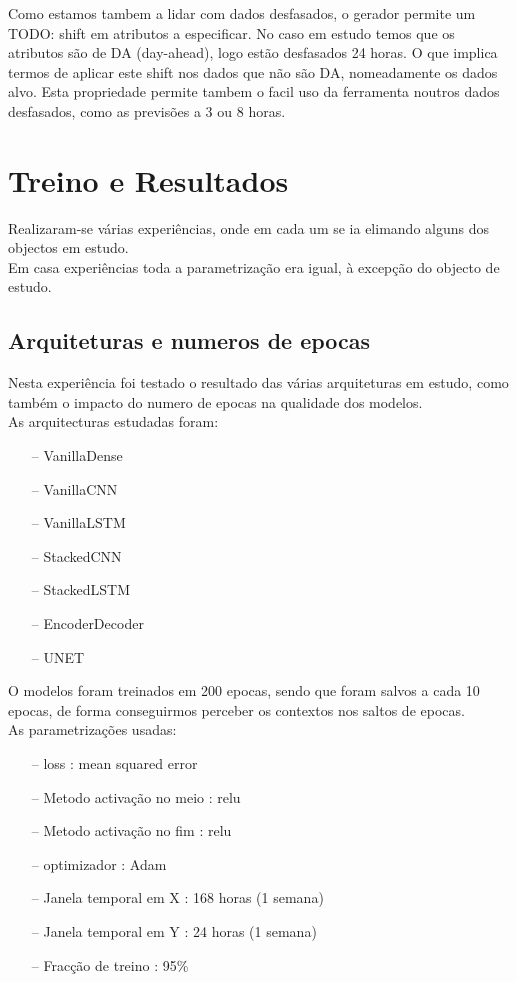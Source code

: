 Como estamos tambem a lidar com dados desfasados, o gerador permite um TODO: shift em atributos a especificar. No caso em estudo temos que os atributos são de DA (day-ahead), logo estão desfasados 24 horas. O que implica termos de aplicar este shift nos dados que não são DA, nomeadamente os dados alvo. Esta propriedade permite tambem o facil uso da ferramenta noutros dados desfasados, como as previsões a 3 ou 8 horas.\\


\section{Treino e Resultados\label{se:training}}

Realizaram-se várias experiências, onde em cada um se ia elimando alguns dos objectos em estudo.\\
Em casa experiências toda a parametrização era igual, à excepção do objecto de estudo.\\

\subsection{Arquiteturas e numeros de epocas}

Nesta experiência foi testado o resultado das várias arquiteturas em estudo, como também o impacto do numero de epocas na qualidade dos modelos.\\
As arquitecturas estudadas foram:


\begin{itemize}
    \item[--] VanillaDense
    \item[--] VanillaCNN
    \item[--] VanillaLSTM
    \item[--] StackedCNN
    \item[--] StackedLSTM
    \item[--] EncoderDecoder
    \item[--] UNET
\end{itemize}

O modelos foram treinados em 200 epocas, sendo que foram salvos a cada 10 epocas, de forma conseguirmos perceber os contextos nos saltos de epocas.\\

As parametrizações usadas:
\begin{itemize}
    \item[--] loss : mean squared error
    \item[--] Metodo activação no meio : relu
    \item[--] Metodo activação no fim : relu
    \item[--] optimizador : Adam
    \item[--] Janela temporal em X : 168 horas (1 semana)
    \item[--] Janela temporal em Y : 24 horas (1 semana)
    \item[--] Fracção de treino : 95\%  
\end{itemize}

